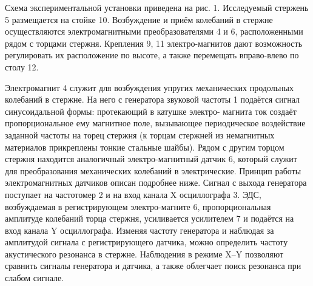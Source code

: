 \documentclass[a4paper, 10pt, twocolumn]{article}
\begin{document}
\par Схема экспериментальной установки приведена на рис. 1. Исследуемый
стержень 5 размещается на стойке 10. Возбуждение и приём колебаний в
стержне осуществляются электромагнитными преобразователями 4 и 6,
расположенными рядом с торцами стержня. Крепления 9, 11 электро-магнитов дают возможность регулировать их расположение по высоте, а
также перемещать вправо-влево по столу 12. \\

\par Электромагнит 4 служит для возбуждения упругих механических продольных колебаний в стержне. На него с генератора звуковой частоты 1 подаётся сигнал синусоидальной формы: протекающий в катушке электро-
магнита ток создаёт пропорциональное ему магнитное поле, вызывающее
периодическое воздействие заданной частоты на торец стержня (к торцам
стержней из немагнитных материалов прикреплены тонкие стальные
шайбы). Рядом с другим торцом стержня находится аналогичный электро-магнитный датчик 6, который служит для преобразования механических
колебаний в электрические. Принцип работы электромагнитных датчиков
описан подробнее ниже.
Сигнал с выхода генератора поступает на частотомер 2 и на вход
канала X осциллографа 3. ЭДС, возбуждаемая в регистрирующем электро-магните 6, пропорциональная амплитуде колебаний торца стержня, усиливается усилителем 7 и подаётся на вход канала Y осциллографа.
Изменяя частоту генератора и наблюдая за амплитудой сигнала с регистрирующего датчика, можно определить частоту акустического резонанса
в стержне. Наблюдения в режиме X–Y позволяют сравнить сигналы генератора и датчика, а также облегчает поиск резонанса при слабом сигнале.
\end{document}
